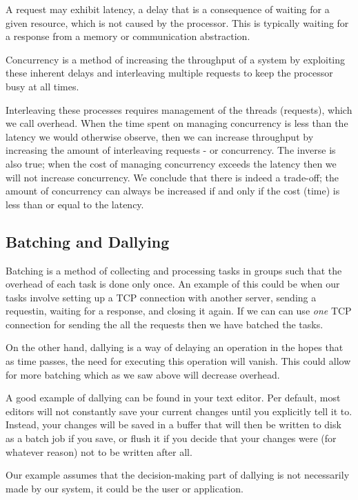 \documentclass[11pt]{article}
\begin{document}
A request may exhibit latency, a delay that is a consequence of waiting for
a given resource, which is not caused by the processor. This is typically
waiting for a response from a memory or communication abstraction.

Concurrency is a method of increasing the throughput of a system by exploiting
these inherent delays and interleaving multiple requests to keep the processor
busy at all times.

Interleaving these processes requires management of the threads (requests),
which we call overhead. When the time spent on managing concurrency is less
than the latency we would otherwise observe, then we can increase throughput
by increasing the amount of interleaving requests - or concurrency. The inverse
is also true; when the cost of managing concurrency exceeds the latency then
we will not increase concurrency. We conclude that there is indeed a trade-off;
the amount of concurrency can always be increased if and only if the cost (time)
is less than or equal to the latency.

\subsection*{Batching and Dallying}

Batching is a method of collecting and processing tasks in groups such that
the overhead of each task is done only once.
An example of this could be when our tasks involve setting up a TCP connection
with another server, sending a requestin, waiting for a response, and closing
it again. If we can can use \emph{one} TCP connection for sending the all the
requests then we have batched the tasks.

On the other hand, dallying is a way of delaying an operation in the hopes that
as time passes, the need for executing this operation will vanish. This
could allow for more batching which as we saw above will decrease overhead. 

A good example of dallying can be found in your text editor. Per default, most
editors will not constantly save your current changes until you explicitly
tell it to. Instead, your changes will be saved in a buffer that will then be
written to disk as a batch job if you save, or flush it if you decide that your
changes were (for whatever reason) not to be written after all.

Our example assumes that the decision-making part of dallying is not necessarily
made by our system, it could be the user or application.
\end{document}
